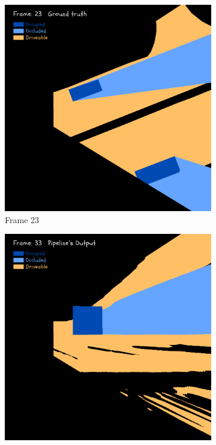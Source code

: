 \begin{figure}[htbp]
\begin{subfigure}[b]{0.19\linewidth}
        \vspace{0.5em}
        \includegraphics[width=\linewidth]{images/experiments/occ2_masks/gt_occ_mask_colored_23.png}
        \caption{Frame 23}
        \label{subfig:occ_masks_frame23}
    \end{subfigure}
    \hfill
    \begin{subfigure}[b]{0.19\linewidth}
        \centering
        \includegraphics[width=\linewidth]{images/experiments/occ2_masks/dt_occ_mask_colored_33.png}

\end{subfigure}
\end{figure}
